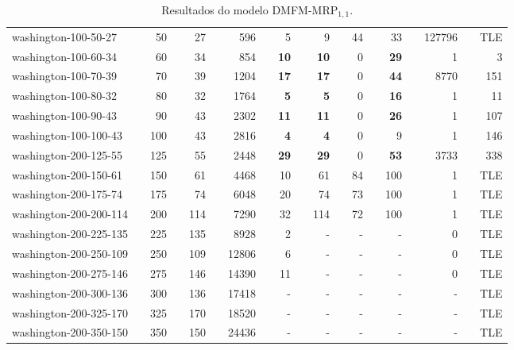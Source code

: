\begin{table}[!ht]
{\begin{tabular}{llrlrlrlrlrlrlrlrlr}
\rowcolor[HTML]{C0C0C0} 
washington-100-50-27 &  & 50 &  & 27 &  & 596 &  & 5 &  & 9 &  & 44 &  & 33 &  & 127796 &  & TLE \\
\rowcolor[HTML]{9B9B9B} 
washington-100-60-34 &  & 60 &  & 34 &  & 854 &  & \textbf{10} &  & \textbf{10} &  & 0 &  & \textbf{29} &  & 1 &  & 3 \\
\rowcolor[HTML]{9B9B9B} 
washington-100-70-39 &  & 70 &  & 39 &  & 1204 &  & \textbf{17} &  & \textbf{17} &  & 0 &  & \textbf{44} &  & 8770 &  & 151 \\
\rowcolor[HTML]{9B9B9B} 
washington-100-80-32 &  & 80 &  & 32 &  & 1764 &  & \textbf{5} &  & \textbf{5} &  & 0 &  & \textbf{16} &  & 1 &  & 11 \\
\rowcolor[HTML]{9B9B9B} 
washington-100-90-43 &  & 90 &  & 43 &  & 2302 &  & \textbf{11} &  & \textbf{11} &  & 0 &  & \textbf{26} &  & 1 &  & 107 \\
\rowcolor[HTML]{9B9B9B} 
washington-100-100-43 &  & 100 &  & 43 &  & 2816 &  & \textbf{4} &  & \textbf{4} &  & 0 &  & 9 &  & 1 &  & 146 \\ \hline
\rowcolor[HTML]{9B9B9B} 
washington-200-125-55 &  & 125 &  & 55 &  & 2448 &  & \textbf{29} &  & \textbf{29} &  & 0 &  & \textbf{53} &  & 3733 &  & 338 \\
\rowcolor[HTML]{C0C0C0} 
washington-200-150-61 &  & 150 &  & 61 &  & 4468 &  & 10 &  & 61 &  & 84 &  & 100 &  & 1 &  & TLE \\
\rowcolor[HTML]{C0C0C0} 
washington-200-175-74 &  & 175 &  & 74 &  & 6048 &  & 20 &  & 74 &  & 73 &  & 100 &  & 1 &  & TLE \\
\rowcolor[HTML]{C0C0C0} 
washington-200-200-114 &  & 200 &  & 114 &  & 7290 &  & 32 &  & 114 &  & 72 &  & 100 &  & 1 &  & TLE \\
washington-200-225-135 &  & 225 &  & 135 &  & 8928 &  & 2 &  & - &  & - &  & - &  & 0 &  & TLE \\
washington-200-250-109 &  & 250 &  & 109 &  & 12806 &  & 6 &  & - &  & - &  & - &  & 0 &  & TLE \\
washington-200-275-146 &  & 275 &  & 146 &  & 14390 &  & 11 &  & - &  & - &  & - &  & 0 &  & TLE \\
washington-200-300-136 &  & 300 &  & 136 &  & 17418 &  & - &  & - &  & - &  & - &  & - &  & TLE \\
washington-200-325-170 &  & 325 &  & 170 &  & 18520 &  & - &  & - &  & - &  & - &  & - &  & TLE \\
washington-200-350-150 &  & 350 &  & 150 &  & 24436 &  & - &  & - &  & - &  & - &  & - &  & TLE \\ \hline
\end{tabular}%
}
\caption{Resultados do  modelo DMFM-MRP$_{1, 1}$.}
\label{tab:dmfm-um}
\end{table}

